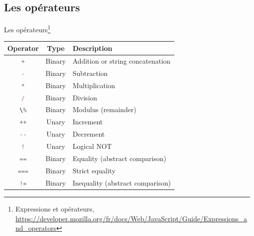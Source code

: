 \documentclass{beamer}
\begin{document}
\subsection{Les opérateurs}\label{subsec:operators}
\begin{frame}{Les opérateurs\footnote{\label{operators}Expressions et opérateurs, \url{https://developer.mozilla.org/fr/docs/Web/JavaScript/Guide/Expressions_and_operators}}}
    \begin{tiny}
        \begin{table}[h!]
            \centering
            \begin{tabular}{|c|c|p{8cm}|}
                \hline
                \textbf{Operator}                     & \textbf{Type} & \textbf{Description}             \\
                \hline
                \lstinline[language=Javascript]!+!    & Binary        & Addition or string concatenation \\
                \hline
                \lstinline[language=Javascript]!-!    & Binary        & Subtraction                      \\
                \hline
                \lstinline[language=Javascript]!*!    & Binary        & Multiplication                   \\
                \hline
                \lstinline[language=Javascript]!/!    & Binary        & Division                         \\
                \hline
                \lstinline[language=Javascript]!\%!   & Binary        & Modulus (remainder)              \\
                \hline
                \lstinline[language=Javascript]!++!   & Unary         & Increment                        \\
                \hline
                \lstinline[language=Javascript]!--!   & Unary         & Decrement                        \\
                \hline
                \lstinline[language=Javascript]|!|    & Unary         & Logical NOT                      \\
                \hline
                \lstinline[language=Javascript]!==!   & Binary        & Equality (abstract comparison)   \\
                \hline
                \lstinline[language=Javascript]!===!  & Binary        & Strict equality                  \\
                \hline
                \lstinline[language=Javascript]|!=|   & Binary        & Inequality (abstract comparison) \\

\end{tabular}
\end{table}
\end{tiny}
\end{frame}
\end{document}
